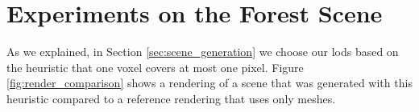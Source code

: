\section{Experiments on the Forest Scene}
\label{sec:experiments_on_the_forest_scene}
As we explained, in Section \ref{sec:scene_generation} we choose our \acsp{lod} based on the heuristic that one voxel covers at most one pixel.
Figure \ref{fig:render_comparison} shows a rendering of a scene that was generated with this heuristic compared to a reference rendering that uses only meshes.
\begin{figure}[t]
    \centering
    \begin{subfigure}[b]{\linewidth}
\end{subfigure}
\end{figure}
